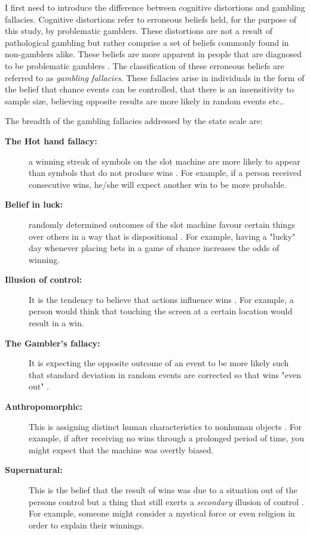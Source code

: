\documentclass[twoside,twocolumn]{article}
\begin{document}
I first need to introduce the difference between cognitive distortions and gambling fallacies. Cognitive distortions refer to erroneous beliefs held, for the purpose of this study, by problematic gamblers. These distortions are not a result of pathological gambling but rather comprise a set of beliefs commonly found in non-gamblers alike. These beliefs are more apparent in people that are diagnosed to be problematic gamblers \cite{Ladouceur:2004}. The classification of these erroneous beliefs are referred to as \emph{gambling fallacies}. These fallacies arise in individuals in the form of the belief that chance events can be controlled, that there is an insensitivity to sample size, believing opposite results are more likely in random events etc.\cite{Leonard:2015}.

The breadth of the gambling fallacies addressed by the state scale are:
\begin{description}
\item[\textbf{The Hot hand fallacy:}] a winning streak of symbols on the slot machine are more likely to appear than symbols that do not produce wins \cite{Leonard:2015}. For example, if a person received consecutive wins, he/she will expect another win to be more probable. 
\item[\textbf{Belief in luck: }] randomly determined outcomes of the slot machine favour certain things over others in a way that is dispositional \cite{Leonard:2015}. For example, having a "lucky" day whenever placing bets in a game of chance increases the odds of winning.
\item[\textbf{Illusion of control:}] It is the tendency to believe that actions influence wins \cite{Leonard:2015}. For example, a person would think that touching the screen at a certain location would result in a win.
\item[\textbf{The Gambler's fallacy:}] It is expecting the opposite outcome of an event to be more likely such that standard deviation in random events are corrected so that wins "even out" \cite{Leonard:2015}.
\item[\textbf{Anthropomorphic:}] This is assigning distinct human characteristics to nonhuman objects \cite{wyatz:2010}. For example, if after receiving no wins through a prolonged period of time, you might expect that the machine was overtly biased. 
\item[\textbf{Supernatural:}] This is the belief that the result of wins was due to a situation out of the persons control but a thing that still exerts a \emph{secondary} illusion of control \cite{ejova:2015}. For example, someone might consider a mystical force or even religion in order to explain their winnings.
\end{description}
\end{document}
